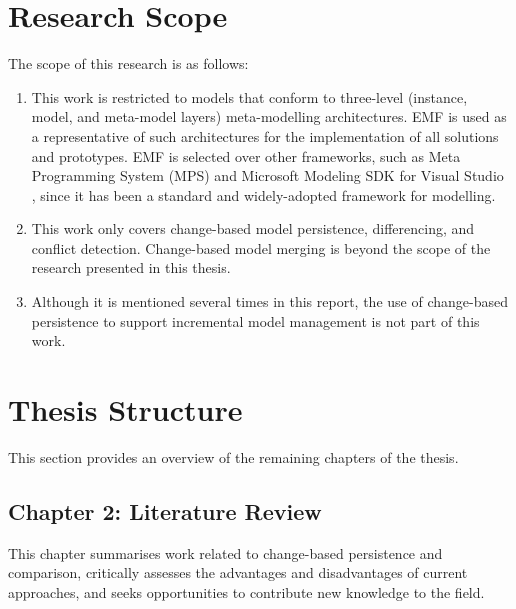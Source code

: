 \section{Research Scope}
\label{sec:research_scope}
The scope of this research is as follows:
\begin{enumerate}
  \item This work is restricted to models that conform to three-level (instance, model, and meta-model layers) meta-modelling architectures. EMF is used as a representative of such architectures for the implementation of all solutions and prototypes. EMF is selected over other frameworks, such as Meta Programming System (MPS) \cite{MPS} and Microsoft Modeling SDK for Visual Studio \cite{modelingSDK}, since it has been a standard and widely-adopted framework for modelling.
  \item This work only covers change-based model persistence, differencing, and conflict detection. Change-based model merging is beyond the scope of the research presented in this thesis.
  \item Although it is mentioned several times in this report, the use of change-based persistence to support incremental model management is not part of this work.
\end{enumerate}

\section{Thesis Structure}
\label{sec:Thesis Structure}
This section provides an overview of the remaining chapters of the thesis.

\subsection{Chapter 2: Literature Review}
\label{sec:chapter_2_literature_review_plan}
This chapter summarises work related to change-based persistence and comparison, critically assesses the advantages and disadvantages of current approaches, and seeks opportunities to contribute new knowledge to the field. 

